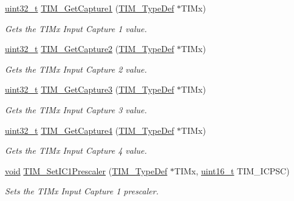 \begin{DoxyCompactItemize}
\hyperlink{stdint_8h_a435d1572bf3f880d55459d9805097f62}{uint32\-\_\-t} \hyperlink{group___t_i_m___group3_ga6bd39ca543305ff0cd06fce0f678d94d}{T\-I\-M\-\_\-\-Get\-Capture1} (\hyperlink{struct_t_i_m___type_def}{T\-I\-M\-\_\-\-Type\-Def} $\ast$T\-I\-Mx)
\begin{DoxyCompactList}\small\item\em Gets the T\-I\-Mx Input Capture 1 value. \end{DoxyCompactList}\item 
\hyperlink{stdint_8h_a435d1572bf3f880d55459d9805097f62}{uint32\-\_\-t} \hyperlink{group___t_i_m___group3_ga2524cb5db14e388fb7f20c99fb3d58a5}{T\-I\-M\-\_\-\-Get\-Capture2} (\hyperlink{struct_t_i_m___type_def}{T\-I\-M\-\_\-\-Type\-Def} $\ast$T\-I\-Mx)
\begin{DoxyCompactList}\small\item\em Gets the T\-I\-Mx Input Capture 2 value. \end{DoxyCompactList}\item 
\hyperlink{stdint_8h_a435d1572bf3f880d55459d9805097f62}{uint32\-\_\-t} \hyperlink{group___t_i_m___group3_ga71ee9ce2c535ec0fb3fac5f9119221f7}{T\-I\-M\-\_\-\-Get\-Capture3} (\hyperlink{struct_t_i_m___type_def}{T\-I\-M\-\_\-\-Type\-Def} $\ast$T\-I\-Mx)
\begin{DoxyCompactList}\small\item\em Gets the T\-I\-Mx Input Capture 3 value. \end{DoxyCompactList}\item 
\hyperlink{stdint_8h_a435d1572bf3f880d55459d9805097f62}{uint32\-\_\-t} \hyperlink{group___t_i_m___group3_ga420b022cbc71ac603b5dd4922687abb1}{T\-I\-M\-\_\-\-Get\-Capture4} (\hyperlink{struct_t_i_m___type_def}{T\-I\-M\-\_\-\-Type\-Def} $\ast$T\-I\-Mx)
\begin{DoxyCompactList}\small\item\em Gets the T\-I\-Mx Input Capture 4 value. \end{DoxyCompactList}\item 
\hyperlink{group___n_a_m_e_ga18028b8badbf1ea7e704ccac3c488e82}{void} \hyperlink{group___t_i_m___group3_gaf0f684dea88e222de9689d8ed0ca8805}{T\-I\-M\-\_\-\-Set\-I\-C1\-Prescaler} (\hyperlink{struct_t_i_m___type_def}{T\-I\-M\-\_\-\-Type\-Def} $\ast$T\-I\-Mx, \hyperlink{stdint_8h_a273cf69d639a59973b6019625df33e30}{uint16\-\_\-t} T\-I\-M\-\_\-\-I\-C\-P\-S\-C)
\begin{DoxyCompactList}\small\item\em Sets the T\-I\-Mx Input Capture 1 prescaler. \end{DoxyCompactList}\item 

\end{DoxyCompactItemize}
